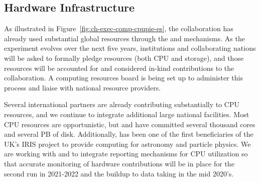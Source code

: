 \subsection{Hardware Infrastructure}
As illustrated in Figure~\ref{fig:ch-exec-comp-cpupie-es}, the  collaboration has already used substantial global resources through the  and  mechanisms. As the experiment evolves over the next five years, institutions and collaborating nations will be asked to formally pledge resources (both CPU and storage), and those resources will be accounted for and considered in-kind contributions to the collaboration.  A   computing resources board  is being set up to administer this process and liaise with national resource providers. 

Several international partners are already contributing substantially to CPU resources, and we continue to  integrate additional large national facilities. Most CPU resources are opportunistic, but  and  have committed several thousand cores and several PB of disk. Additionally,   has been one of the first beneficiaries of the UK's IRIS project to provide computing for astronomy and particle physics.  
We are working with  and  to integrate reporting mechanisms for CPU utilization so that accurate monitoring of hardware contributions will be in place for the second  run in 2021-2022 and the buildup to data taking in the mid 2020's. 


